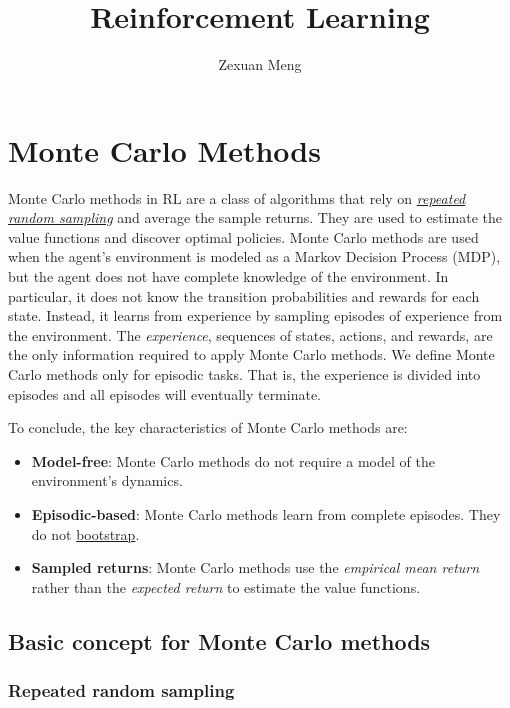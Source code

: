 \documentclass{article}
\title{Reinforcement Learning}
\author{Zexuan Meng}
\begin{document}
\maketitle

\section{Monte Carlo Methods}

Monte Carlo methods in RL are a class of algorithms that rely on \hyperref[sec:repeated-random-sampling]{\emph{repeated random sampling}} and average the sample returns. They are used to estimate the value functions and discover optimal policies. Monte Carlo methods are used when the agent's environment is modeled as a Markov Decision Process (MDP), but the agent does not have complete knowledge of the environment. In particular, it does not know the transition probabilities and rewards for each state. Instead, it learns from experience by sampling episodes of experience from the environment. The \emph{experience}, sequences of states, actions, and rewards, are the only information required to apply Monte Carlo methods. We define Monte Carlo methods only for episodic tasks. That is, the experience is divided into episodes and all episodes will eventually terminate.

To conclude, the key characteristics of Monte Carlo methods are:

\begin{itemize}
    \item \textbf{Model-free}: Monte Carlo methods do not require a model of the environment's dynamics.
    \item \textbf{Episodic-based}: Monte Carlo methods learn from complete episodes. They do not \hyperref[sec:bootstrapping]{bootstrap}.
    \item \textbf{Sampled returns}: Monte Carlo methods use the \emph{empirical mean return} rather than the \emph{expected return} to estimate the value functions.
\end{itemize}

\subsection{Basic concept for Monte Carlo methods}

\subsubsection{Repeated random sampling}\label{sec:repeated-random-sampling}
\end{document}
